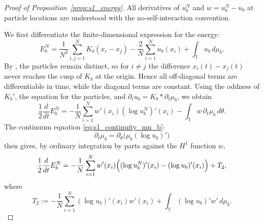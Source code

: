 \documentclass[11pt]{article}
\theoremstyle{definition}
\newcommand{\Torus}{\mathbb{T}}
\begin{document}
  \begin{proof}[Proof of Proposition~\ref{prop:s1_energy}]
All derivatives of \(u^N_b\) and \(w=u^N_b-u_b\) at particle locations are
understood with the no-self-interaction convention.

We first differentiate the finite-dimensional expression for the energy:
\begin{equation}
\label{eq:s1_energy_finite_dim}
E^N_b
=
\frac1{N^2}\sum_{i,j=1}^N K_b(x_i-x_j)
-\frac2N\sum_{i=1}^N u_b(x_i)
+\int_{\Torus}u_b\,d\mu_b .
\end{equation}
By , the particles remain distinct, so for
$i\neq j$ the difference $x_i(t)-x_j(t)$ never reaches the cusp of $K_b$ at
the origin. Hence all off-diagonal terms are differentiable in time, while
the diagonal terms are constant.
Using the oddness of
\(K_b'\), the equation for the particles, and
\(\partial_tu_b=K_b*\partial_t\mu_b\), we obtain
\[
\frac12\frac{d}{dt}E^N_b
=
-\frac1N\sum_{i=1}^N w'(x_i)(\log u^N_b)'(x_i)
-\int_{\Torus}w\,\partial_t\mu_b\,d\theta .
\]
The continuum equation \eqref{eq:s1_continuity_mu_b}:
\[
\partial_t\mu_b=\partial_\theta\bigl(\mu_b(\log u_b)'\bigr)
\]
then gives, by ordinary integration by parts against the \(H^1\) function \(w\),
\[
\frac12\frac{d}{dt}E^N_b
=
-\frac1N\sum_{i=1}^N
w'(x_i)\Bigl((\log u^N_b)'(x_i)-(\log u_b)'(x_i)\Bigr)
+T_2 ,
\]
where
\[
T_2
:=
-\frac1N\sum_{i=1}^N(\log u_b)'(x_i)w'(x_i)
+
\int_{\Torus}(\log u_b)'w'\,d\mu_b .
\]


\end{proof}
\end{document}
